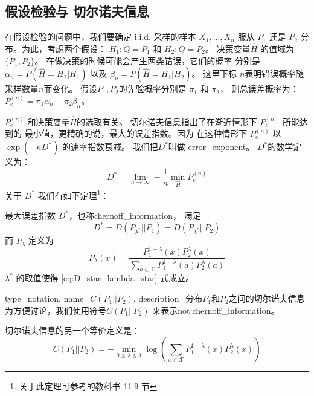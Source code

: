 \subsection{假设检验与 切尔诺夫信息}
在假设检验的问题中，我们要确定 i.i.d. 采样的样本
$X_1, \dots, X_n$ 服从
$P_1$ 还是 $P_2$ 分布。为此，考虑两个假设：
$H_1: Q=P_1$ 和 $H_2: Q=P_2$。
决策变量$\widehat{H}$ 的值域为 $\{P_1, P_2\}$。
在做决策的时候可能会产生两类错误，它们的概率
分别是 $\alpha_n=P(\widehat{H}=H_2|H_1)$
以及 $\beta_n=P(\widehat{H}=H_1|H_2)$。
这里下标 $n$表明错误概率随采样数量$n$而变化。
假设$P_1, P_2$的先验概率分别是 $\pi_1$ 和 $\pi_2$，
则总误差概率为：$P_e^{(n)} = \pi_1 \alpha_n
+ \pi_2 \beta_n$。

$P_e^{(n)}$ 和决策变量$\widehat{H}$的选取有关。
切尔诺夫信息指出了在渐近情形下 $P_e^{(n)}$ 所能达到的
最小值，更精确的说，最大的误差指数。因为
在这种情形下 $P_e^{(n)}$ 以 $\exp(-n D^*)$ 的速率指数衰减。
我们把$D^*$叫做 \gls{error_exponent}。
$D^*$的数学定义为：
\begin{equation}
 D^* = \lim_{n\to \infty} -\frac{1}{n} \min_{\widehat{H}}
 P^{(n)}_e
\end{equation}
关于 $D^*$ 我们有如下定理\footnote{关于此定理可参考\citet{cover1999elements}的教科书
11.9 节}：
\begin{theorem}
  最大误差指数 $D^*$，也称\gls{chernoff_information}， 满足
  \begin{equation}\label{eq:D_star_lambda_star}
    D^* = D(P_{\lambda^*} || P_1) = D(P_{\lambda^*}|| P_2)
  \end{equation}
  而 $P_{\lambda}$ 定义为
  \begin{equation}\label{eq:P_lambda_x}
    P_{\lambda}(x) = \frac{P^{1-\lambda}_1 (x) P^{\lambda}_2 (x)}
    {\sum_{a \in \mathcal{X}} P^{1-\lambda}_1 (a) P^{\lambda}_2 (a)}
  \end{equation}
  $\lambda^*$ 的取值使得  \eqref{eq:D_star_lambda_star} 式成立。
\end{theorem}

{
  type=notation,
  name={$C(P_1||P_2)$},
  description={分布$P_1$和$P_2$之间的切尔诺夫信息}
}
为方便讨论，我们使用符号$C(P_1||P_2)$
来表示\glsdesc{not:chernoff_information}。

切尔诺夫信息的另一个等价定义是：
\begin{equation}\label{eq:C_P_1_P_2_another}
  C(P_1||P_2) = -\min_{0\leq \lambda \leq 1}
  \log \left(\sum_{x \in \mathcal{X}}
  P^{1-\lambda}_1(x)P^{\lambda}_2(x)
  \right)
\end{equation}

